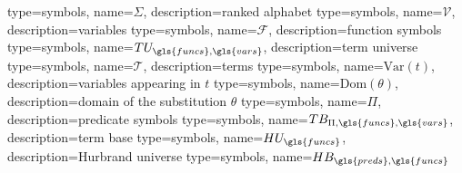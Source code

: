 
\makeglossary

{
    type=symbols,
    name={\ensuremath{\Sigma}},
    description={ranked alphabet}
}
{
    type=symbols,
    name={\ensuremath{\mathcal{V}}},
    description={variables}
}
{
    type=symbols,
    name={\ensuremath{\mathcal{F}}},
    description={function symbols}
}
{
    type=symbols,
    name={\ensuremath{TU_{\gls{funcs},\gls{vars}}}},
    description={term universe}
}
{
    type=symbols,
    name={\ensuremath{\mathcal{T}}},
    description={terms}
}
{
    type=symbols,
    name={\ensuremath{\mathrm{Var}(t)}},
    description={variables appearing in \(t\)}
}
{
    type=symbols,
    name={\ensuremath{\mathrm{Dom}(\theta)}},
    description={domain of the substitution \(\theta\)}
}
{
    type=symbols,
    name={\ensuremath{\Pi}},
    description={predicate symbols}
}
{
    type=symbols,
    name={\ensuremath{TB_{\Pi,\gls{funcs},\gls{vars}}}},
    description={term base}
}
{
    type=symbols,
    name={\ensuremath{HU_{\gls{funcs}}}},
    description={Hurbrand universe}
}
{
    type=symbols,
    name={\ensuremath{HB_{\gls{preds},\gls{funcs}}}}
}